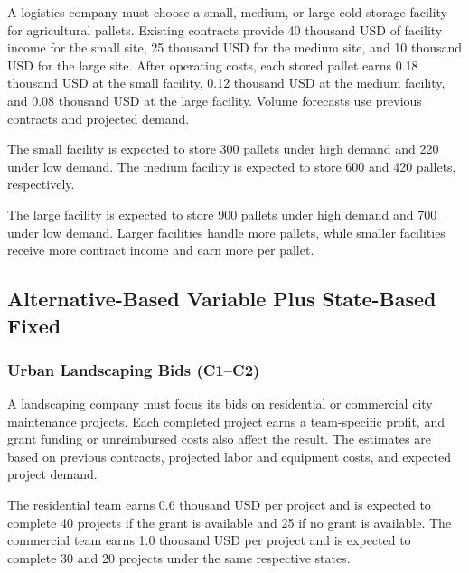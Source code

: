 	A logistics company must choose a small, medium, or large cold-storage facility for agricultural pallets. Existing contracts provide 40 thousand USD of facility income for the small site, 25 thousand USD for the medium site, and 10 thousand USD for the large site. After operating costs, each stored pallet earns 0.18 thousand USD at the small facility, 0.12 thousand USD at the medium facility, and 0.08 thousand USD at the large facility. Volume forecasts use previous contracts and projected demand.
	
	The small facility is expected to store 300 pallets under high demand and 220 under low demand. The medium facility is expected to store 600 and 420 pallets, respectively.
	
	The large facility is expected to store 900 pallets under high demand and 700 under low demand. Larger facilities handle more pallets, while smaller facilities receive more contract income and earn more per pallet.
	
	\subsection{Alternative-Based Variable Plus State-Based Fixed}
	\label{sec:alternative-based-variable-payoff-plus-state-based-fixed-payoff}



	\subsubsection{Urban Landscaping Bids (C1--C2)}
	\label{sec:problem18-urban-landscaping-bids-c1-c2}
	
	A landscaping company must focus its bids on residential or commercial city maintenance projects. Each completed project earns a team-specific profit, and grant funding or unreimbursed costs also affect the result. The estimates are based on previous contracts, projected labor and equipment costs, and expected project demand.
	
	The residential team earns 0.6 thousand USD per project and is expected to complete 40 projects if the grant is available and 25 if no grant is available. The commercial team earns 1.0 thousand USD per project and is expected to complete 30 and 20 projects under the same respective states.
	
